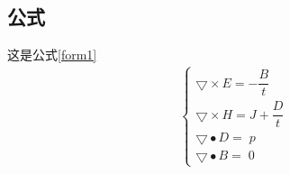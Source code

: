 \subsection{公式}
这是公式\ref{form1}
\begin{eqnarray}
\label{form1}
\begin{cases}
\bigtriangledown \times E = -\dfrac{B}{\scriptstyle t} \\
\bigtriangledown \times {H} = J + \dfrac{D}{\scriptstyle t} \\
\bigtriangledown \bullet D = \; \scriptstyle  p　\\
\bigtriangledown \bullet B = \; \scriptstyle 0
\end{cases} 
\end{eqnarray}
